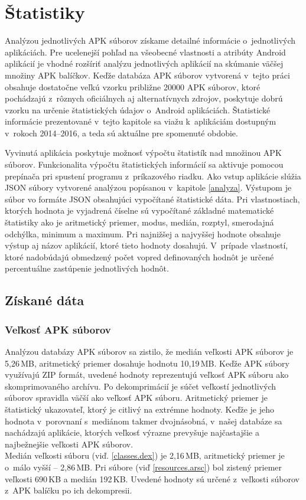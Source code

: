 \chapter{Štatistiky}
\label{statistiky}
Analýzou jednotlivých APK súborov získame detailné informácie o~jednotlivých aplikáciách. Pre ucelenejší pohľad na všeobecné vlastnosti a atribúty Android aplikácií je vhodné rozšíriť analýzu jednotlivých aplikácií na skúmanie väčšej množiny APK balíčkov. Keďže databáza APK súborov vytvorená v~tejto práci obsahuje dostatočne veľkú vzorku približne 20000 APK súborov, ktoré pochádzajú z~rôznych oficiálnych aj alternatívnych zdrojov, poskytuje dobrú vzorku na určenie štatistických údajov o~Android aplikáciách. Štatistické informácie prezentované v~tejto kapitole sa viažu k~aplikáciám dostupným v~rokoch 2014--2016, a teda sú aktuálne pre spomenuté obdobie.

Vyvinutá aplikácia  poskytuje možnosť výpočtu štatistík nad množinou APK súborov. Funkcionalita výpočtu štatistických informácií sa aktivuje pomocou prepínača  pri spustení programu z~príkazového riadku. Ako vstup aplikácie slúžia JSON súbory vytvorené analýzou popísanou v~kapitole \ref{analyza}. Výstupom je súbor vo formáte JSON obsahujúci vypočítané štatistické dáta. Pri vlastnostiach, ktorých hodnota je vyjadrená číselne sú vypočítané základné matematické štatistiky ako je aritmetický priemer, modus, medián, rozptyl, smerodajná odchýlka, minimum a maximum. Pri najnižšej a najvyššej hodnote obsahuje výstup aj názov aplikácií, ktoré tieto hodnoty dosahujú. V~prípade vlastností, ktoré nadobúdajú obmedzený počet vopred definovaných hodnôt je určené percentuálne zastúpenie jednotlivých hodnôt.

\section{Získané dáta}
\subsection{Veľkosť APK súborov}
Analýzou databázy APK súborov sa zistilo, že medián veľkosti APK súborov je 5,26\,MB, aritmetický priemer dosahuje hodnotu 10,19\,MB. Keďže APK súbory využívajú ZIP formát, uvedené hodnoty reprezentujú veľkosť APK súboru ako skomprimovaného archívu. Po dekomprimácií je súčet veľkostí jednotlivých súborov spravidla väčší ako veľkosť APK súboru. Aritmetický priemer je štatistický ukazovateľ, ktorý je citlivý na extrémne hodnoty. Keďže je jeho hodnota v~porovnaní s~mediánom takmer dvojnásobná, v~našej databáze sa nachádzajú aplikácie, ktorých veľkosť výrazne prevyšuje najčastajšie a najbežnejšie veľkosti APK súborov.\\ Medián veľkosti súboru  (viď. \ref{classes.dex}) je 2,16\,MB, aritmetický priemer je o~málo vyšší -- 2,86\,MB. Pri súbore  (viď \ref{resources.arsc}) bol zistený priemer veľkosti 690\,KB a medián 192\,KB. Uvedené hodnoty sú určené z~veľkosti súborov z~APK balíčku po ich dekompresii.


